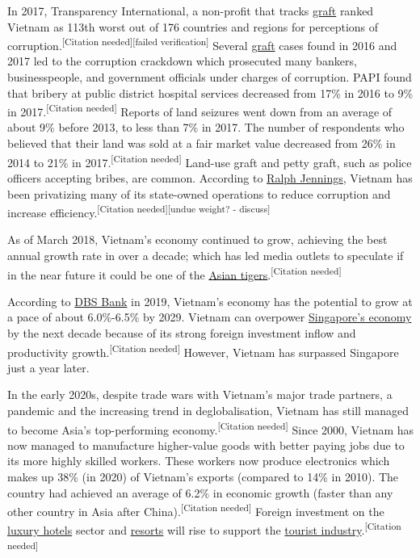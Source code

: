 \documentclass{article}
\begin{document}
In 2017, Transparency International, a non-profit that tracks \href{https://en.wikipedia.org/wiki/Graft_(politics)}{graft} ranked Vietnam as 113th worst out of 176 countries and regions for perceptions of corruption.\textsuperscript{[Citation needed][failed verification]} Several \href{https://en.wikipedia.org/wiki/Graft_(politics)}{graft} cases found in 2016 and 2017 led to the corruption crackdown which prosecuted many bankers, businesspeople, and government officials under charges of corruption. PAPI found that bribery at public district hospital services decreased from 17\% in 2016 to 9\% in 2017.\textsuperscript{[Citation needed]} Reports of land seizures went down from an average of about 9\% before 2013, to less than 7\% in 2017. The number of respondents who believed that their land was sold at a fair market value decreased from 26\% in 2014 to 21\% in 2017.\textsuperscript{[Citation needed]} Land-use graft and petty graft, such as police officers accepting bribes, are common. According to \href{https://en.wikipedia.org/wiki/Ralph_Jennings}{Ralph Jennings}, Vietnam has been privatizing many of its state-owned operations to reduce corruption and increase efficiency.\textsuperscript{[Citation needed][undue weight? - discuss]}

As of March 2018, Vietnam's economy continued to grow, achieving the best annual growth rate in over a decade; which has led media outlets to speculate if in the near future it could be one of the \href{https://en.wikipedia.org/wiki/Four_Asian_Tigers}{Asian tigers}.\textsuperscript{[Citation needed]}

According to \href{https://en.wikipedia.org/wiki/DBS_Bank}{DBS Bank} in 2019, Vietnam's economy has the potential to grow at a pace of about 6.0\%-6.5\% by 2029. Vietnam can overpower \href{https://en.wikipedia.org/wiki/Economy_of_Singapore}{Singapore's economy} by the next decade because of its strong foreign investment inflow and productivity growth.\textsuperscript{[Citation needed]} However, Vietnam has surpassed Singapore just a year later.

In the early 2020s, despite trade wars with Vietnam's major trade partners, a pandemic and the increasing trend in deglobalisation, Vietnam has still managed to become Asia's top-performing economy.\textsuperscript{[Citation needed]} Since 2000, Vietnam has now managed to manufacture higher-value goods with better paying jobs due to its more highly skilled workers. These workers now produce electronics which makes up 38\% (in 2020) of Vietnam's exports (compared to 14\% in 2010). The country had achieved an average of 6.2\% in economic growth (faster than any other country in Asia after China).\textsuperscript{[Citation needed]} Foreign investment on the \href{https://en.wikipedia.org/wiki/Luxury_hotel}{luxury hotels} sector and \href{https://en.wikipedia.org/wiki/Resorts}{resorts} will rise to support the \href{https://en.wikipedia.org/wiki/Tourist_industry}{tourist industry}.\textsuperscript{[Citation needed]}
\end{document}
